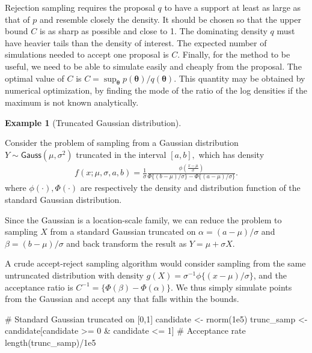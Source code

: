 \documentclass[
  11pt,
  letterpaper,
]{scrbook}
\newenvironment{Shaded}{\begin{snugshade}}{\end{snugshade}}
\newcommand{\CommentTok}[1]{\textcolor[rgb]{0.37,0.37,0.37}{#1}}
\newcommand{\DecValTok}[1]{\textcolor[rgb]{0.68,0.00,0.00}{#1}}
\newcommand{\FloatTok}[1]{\textcolor[rgb]{0.68,0.00,0.00}{#1}}
\newcommand{\FunctionTok}[1]{\textcolor[rgb]{0.28,0.35,0.67}{#1}}
\newcommand{\NormalTok}[1]{\textcolor[rgb]{0.00,0.23,0.31}{#1}}
\newcommand{\OtherTok}[1]{\textcolor[rgb]{0.00,0.23,0.31}{#1}}
\newcommand{\SpecialCharTok}[1]{\textcolor[rgb]{0.37,0.37,0.37}{#1}}
\theoremstyle{definition}
\theoremstyle{plain}
\theoremstyle{plain}
\theoremstyle{definition}
\newtheorem{example}{Example}[chapter]
\theoremstyle{definition}
\theoremstyle{remark}
\begin{document}
Rejection sampling requires the proposal \(q\) to have a support at
least as large as that of \(p\) and resemble closely the density. It
should be chosen so that the upper bound \(C\) is as sharp as possible
and close to 1. The dominating density \(q\) must have heavier tails
than the density of interest. The expected number of simulations needed
to accept one proposal is \(C.\) Finally, for the method to be useful,
we need to be able to simulate easily and cheaply from the proposal. The
optimal value of \(C\) is
\(C = \sup_{\boldsymbol{\theta}} p(\boldsymbol{\theta}) / q(\boldsymbol{\theta})\).
This quantity may be obtained by numerical optimization, by finding the
mode of the ratio of the log densities if the maximum is not known
analytically.

\begin{example}[Truncated Gaussian
distribution]\protect\hypertarget{exm-accept-reject-truncated}{}\label{exm-accept-reject-truncated}

Consider the problem of sampling from a Gaussian distribution
\(Y \sim \mathsf{Gauss}(\mu, \sigma^2)\) truncated in the interval
\([a, b],\) which has density \begin{align*}
f(x; \mu, \sigma, a, b) = \frac{1}{\sigma}\frac{\phi\left(\frac{x-\mu}{\sigma}\right)}{\Phi\{(b-\mu)/\sigma\}-\Phi\{(a-\mu)/\sigma\}}.
\end{align*} where \(\phi(\cdot), \Phi(\cdot)\) are respectively the
density and distribution function of the standard Gaussian distribution.

Since the Gaussian is a location-scale family, we can reduce the problem
to sampling \(X\) from a standard Gaussian truncated on
\(\alpha = (a-\mu)/\sigma\) and \(\beta = (b-\mu)/\sigma\) and back
transform the result as \(Y = \mu + \sigma X\).

A crude accept-reject sampling algorithm would consider sampling from
the same untruncated distribution with density
\(g(X) = \sigma^{-1}\phi\{(x-\mu)/\sigma\}\), and the acceptance ratio
is \(C^{-1}=\{\Phi(\beta) - \Phi(\alpha)\}\). We thus simply simulate
points from the Gaussian and accept any that falls within the bounds.

\begin{Shaded}
\begin{Highlighting}[]
\CommentTok{\# Standard Gaussian truncated on [0,1]}
\NormalTok{candidate }\OtherTok{\textless{}{-}} \FunctionTok{rnorm}\NormalTok{(}\FloatTok{1e5}\NormalTok{)}
\NormalTok{trunc\_samp }\OtherTok{\textless{}{-}}\NormalTok{ candidate[candidate }\SpecialCharTok{\textgreater{}=} \DecValTok{0} \SpecialCharTok{\&}\NormalTok{ candidate }\SpecialCharTok{\textless{}=} \DecValTok{1}\NormalTok{]}
\CommentTok{\# Acceptance rate}
\FunctionTok{length}\NormalTok{(trunc\_samp)}\SpecialCharTok{/}\FloatTok{1e5}
\end{Highlighting}
\end{Shaded}


\end{example}
\end{document}
